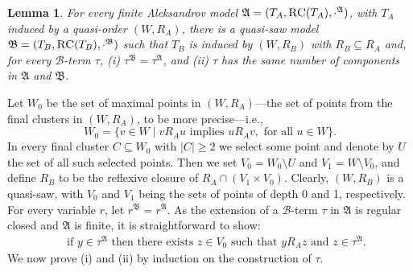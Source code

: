 \documentclass{LMCS}
\theoremstyle{plain}
\newtheorem{lemma}[thm]{Lemma}
\newcommand{\cB}{\ensuremath{\mathcal{B}}}\newcommand{\cBc}{\ensuremath{\mathcal{B}c}}\newcommand{\cBcc}{\ensuremath{\mathcal{B}cc}}
\begin{document}
\begin{lemma}\label{broom-lemma}
For every finite Aleksandrov model $\mathfrak{A} =
(T_A, \textsc{RC}(T_A), \cdot^\mathfrak{A})$, with $T_A$ induced by a quasi-order $(W,R_A)$, there is a
quasi-saw model $\mathfrak{B} = (T_B, \textsc{RC}(T_B),\cdot^\mathfrak{B})$ such that
$T_B$ is induced by $(W,R_B)$ with $R_B\subseteq R_A$ and, for every
$\cB$-term $\tau$, \textup{(i)} $\tau^\mathfrak{B} =
\tau^\mathfrak{A}$, and \textup{(ii)} $\tau$ has the same number of
components in $\mathfrak{A}$ and $\mathfrak{B}$.
\end{lemma}
\proof
Let $W_0$ be the set of maximal points in $(W, R_A)$---the set of
points from the final clusters in $(W, R_A)$, to be more
precise---i.e.,
\begin{equation*}
W_0 = \{ v\in W \mid vR_Au \text{ implies } uR_Av, \text{ for all } u\in W\}.
\end{equation*}
In every final cluster $C \subseteq W_0$ with $|C|\ge 2$ we select some
point and denote by $U$ the set of all such selected points. Then we set $V_0
= W_0 \setminus U$ and $V_1 = W \setminus V_0$, and
define $R_B$ to be the reflexive closure of $R_A \cap (V_1 \times
V_0)$. Clearly, $(W,R_B)$ is a quasi-saw, with $V_0$
and $V_1$ being the sets of points of depth 0 and  1, respectively.
For every variable $r$, let
$r^\mathfrak{B} = r^\mathfrak{A}$.
As the extension of a $\cB$-term $\tau$ in $\mathfrak A$ is regular closed
and $\mathfrak A$ is finite, it is straightforward to show:
\begin{align}\label{eq:rc:max-cluster}
& \text{ if } y\in\tau^\mathfrak{A} \text{ then there exists } z \in V_0
\text{ such that } yR_Az \text{ and } z\in\tau^\mathfrak{A} .
\end{align}
We now prove (i) and (ii) by induction on the construction of $\tau$.
\end{document}
